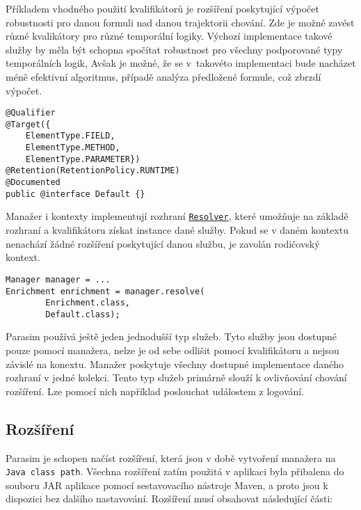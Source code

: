 Příkladem vhodného použití kvalifikátorů je rozšíření poskytující
vý\-počet robustnosti pro danou formuli nad danou trajektorii chování. Zde je možné zavést
různé kvalikátory pro různé temporální logiky. Výchozí implementace takové služby
by měla být schopna spočítat robustnost pro všechny podporované typy temporálních logik,
Avšak je možné, že se v~takovéto implementaci bude nacházet méně efektivní algoritmus,
případě analýza předložené formule, což zbrzdí výpočet.

\begin{lstlisting}[label={code:qualifier}, caption={Kvalikátor}, style=Java]
@Qualifier
@Target({
	ElementType.FIELD,
	ElementType.METHOD,
	ElementType.PARAMETER})
@Retention(RetentionPolicy.RUNTIME)
@Documented
public @interface Default {}
\end{lstlisting}

Manažer i kontexty implementují rozhraní \href{https://github.com/sybila/parasim/blob/2.0.0.Final/core/src/main/java/org/sybila/parasim/core/api/Resolver.java}{\texttt{Resolver}},
které umožňuje na základě rozhraní a kvalifikátoru získat instance dané služby.
Pokud se v daném kontextu nenachází žádné rozšíření poskytující danou službu,
je zavolán rodičovský kontext. 

\begin{lstlisting}[label={code:resolve}, caption={Získání instance služby}, style=Java]
Manager manager = ...
Enrichment enrichment = manager.resolve(
		Enrichment.class,
		Default.class);
\end{lstlisting}

Parasim používá ještě jeden jednodušší typ služeb. Tyto služby jsou dostupné pouze
pomocí manažera, nelze je od sebe odlišit pomocí kvalifikátoru a nejsou závislé na konextu.
Manažer poskytuje všechny dostupné implementace daného rozhraní v jedné kolekci. Tento typ služeb
primárně  slouží k ovlivňování cho\-vání rozšíření. Lze pomocí nich například
poslouchat událostem z logování.

\subsection{Rozšíření}

Parasim je schopen načíst rozšíření, která jsou v době vytvoření manažera na \texttt{Java class path}.
Všechna rozšíření zatím použitá v aplikaci byla přibalena do souboru JAR aplikace pomocí sestavovacího
nástroje Maven, a proto jsou k dispozici bez dalšího nasta\-vo\-vá\-ní. Rozšíření musí obsahovat
následující části:

